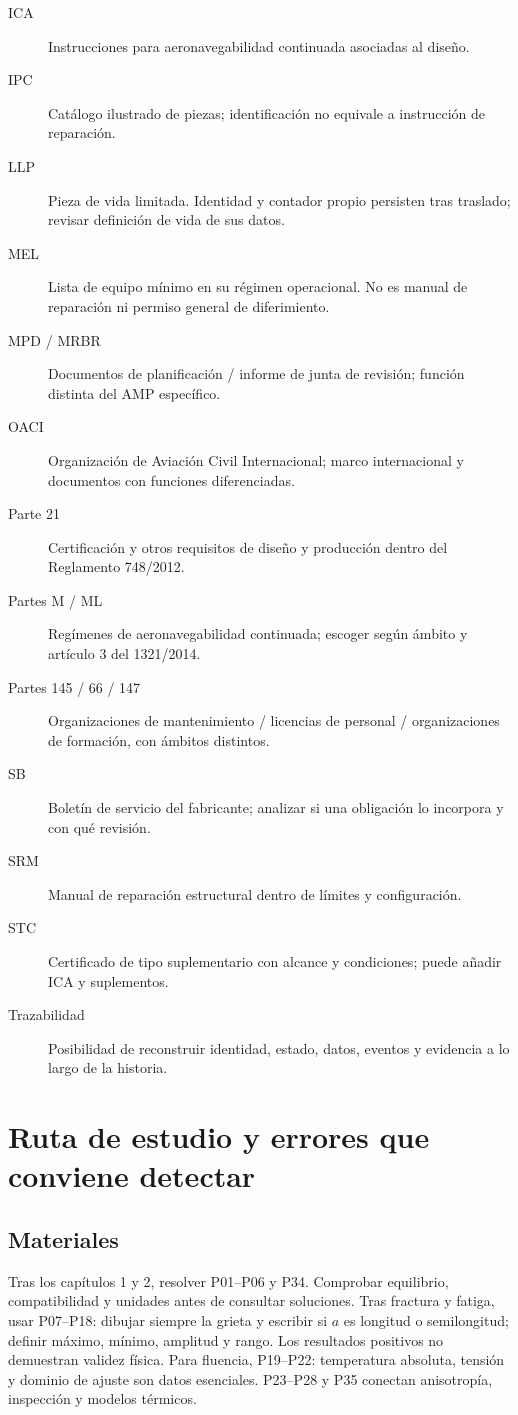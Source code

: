 \begin{description}
\item[ICA] Instrucciones para aeronavegabilidad continuada asociadas al diseño.
\item[IPC] Catálogo ilustrado de piezas; identificación no equivale a instrucción de reparación.
\item[LLP] Pieza de vida limitada. Identidad y contador propio persisten tras traslado; revisar definición de vida de sus datos.
\item[MEL] Lista de equipo mínimo en su régimen operacional. No es manual de reparación ni permiso general de diferimiento.
\item[MPD / MRBR] Documentos de planificación / informe de junta de revisión; función distinta del AMP específico.
\item[OACI] Organización de Aviación Civil Internacional; marco internacional y documentos con funciones diferenciadas.
\item[Parte 21] Certificación y otros requisitos de diseño y producción dentro del Reglamento 748/2012.
\item[Partes M / ML] Regímenes de aeronavegabilidad continuada; escoger según ámbito y artículo 3 del 1321/2014.
\item[Partes 145 / 66 / 147] Organizaciones de mantenimiento / licencias de personal / organizaciones de formación, con ámbitos distintos.
\item[SB] Boletín de servicio del fabricante; analizar si una obligación lo incorpora y con qué revisión.
\item[SRM] Manual de reparación estructural dentro de límites y configuración.
\item[STC] Certificado de tipo suplementario con alcance y condiciones; puede añadir ICA y suplementos.
\item[Trazabilidad] Posibilidad de reconstruir identidad, estado, datos, eventos y evidencia a lo largo de la historia.
\end{description}
\chapter{Ruta de estudio y errores que conviene detectar}
\section{Materiales}
Tras los capítulos 1 y 2, resolver P01--P06 y P34. Comprobar equilibrio, compatibilidad y unidades antes de consultar soluciones. Tras fractura y fatiga, usar P07--P18: dibujar siempre la grieta y escribir si $a$ es longitud o semilongitud; definir máximo, mínimo, amplitud y rango. Los resultados positivos no demuestran validez física. Para fluencia, P19--P22: temperatura absoluta, tensión y dominio de ajuste son datos esenciales. P23--P28 y P35 conectan anisotropía, inspección y modelos térmicos.
